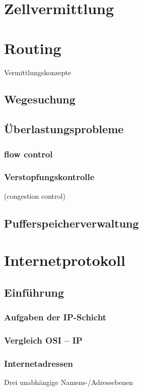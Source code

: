 \section{Zellvermittlung}
\section{Routing}
Vermittlungskonzepte
\subsection{Wegesuchung}
\subsection{Überlastungsprobleme}
\subsubsection{flow control}
\subsubsection{Verstopfungskontrolle}
(congestion control)
\subsection{Pufferspeicherverwaltung}

\section{Internetprotokoll}
\subsection{Einführung}
\subsubsection{Aufgaben der IP-Schicht}
\subsubsection{Vergleich OSI -- IP}
\subsubsection{Internetadressen}
Drei unabhängige Namens-/Adressebenen
